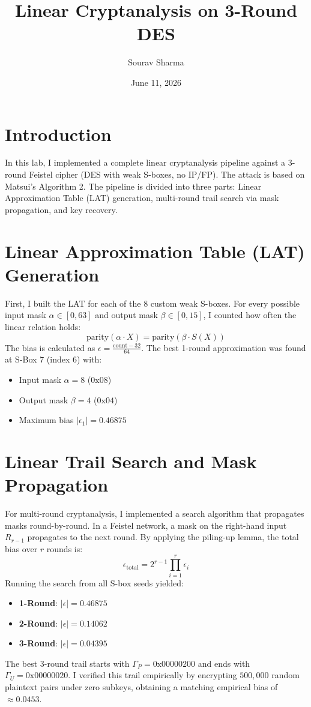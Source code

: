 \documentclass{article}
\title{Linear Cryptanalysis on 3-Round DES}
\author{Sourav Sharma}
\date{June 11, 2026}
\begin{document}
\maketitle

\section{Introduction}
In this lab, I implemented a complete linear cryptanalysis pipeline against a 3-round Feistel cipher (DES with weak S-boxes, no IP/FP). The attack is based on Matsui's Algorithm 2. The pipeline is divided into three parts: Linear Approximation Table (LAT) generation, multi-round trail search via mask propagation, and key recovery.

\section{Linear Approximation Table (LAT) Generation}
First, I built the LAT for each of the 8 custom weak S-boxes. For every possible input mask $\alpha \in [0, 63]$ and output mask $\beta \in [0, 15]$, I counted how often the linear relation holds:
\[
\text{parity}(\alpha \cdot X) = \text{parity}(\beta \cdot S(X))
\]
The bias is calculated as $\epsilon = \frac{\text{count} - 32}{64}$. 
The best 1-round approximation was found at S-Box 7 (index 6) with:
\begin{itemize}
    \item Input mask $\alpha = 8$ ($0\text{x}08$)
    \item Output mask $\beta = 4$ ($0\text{x}04$)
    \item Maximum bias $|\epsilon_1| = 0.46875$
\end{itemize}

\section{Linear Trail Search and Mask Propagation}
For multi-round cryptanalysis, I implemented a search algorithm that propagates masks round-by-round. In a Feistel network, a mask on the right-hand input $R_{r-1}$ propagates to the next round. By applying the piling-up lemma, the total bias over $r$ rounds is:
\[
\epsilon_{\text{total}} = 2^{r-1} \prod_{i=1}^r \epsilon_i
\]
Running the search from all S-box seeds yielded:
\begin{itemize}
    \item \textbf{1-Round}: $|\epsilon| = 0.46875$
    \item \textbf{2-Round}: $|\epsilon| = 0.14062$
    \item \textbf{3-Round}: $|\epsilon| = 0.04395$
\end{itemize}
The best 3-round trail starts with $\Gamma_P = 0\text{x}00000200$ and ends with $\Gamma_U = 0\text{x}00000020$. I verified this trail empirically by encrypting $500,000$ random plaintext pairs under zero subkeys, obtaining a matching empirical bias of $\approx 0.0453$.
\end{document}

